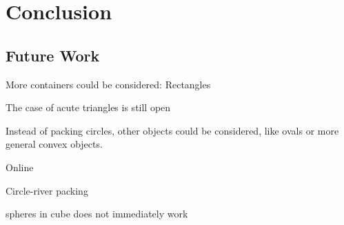\chapter{Conclusion}

\section{Future Work}

More containers could be considered: Rectangles

The case of acute triangles is still open

Instead of packing circles, other objects could be considered, like ovals or more general convex objects.

Online

Circle-river packing

spheres in cube does not immediately work
